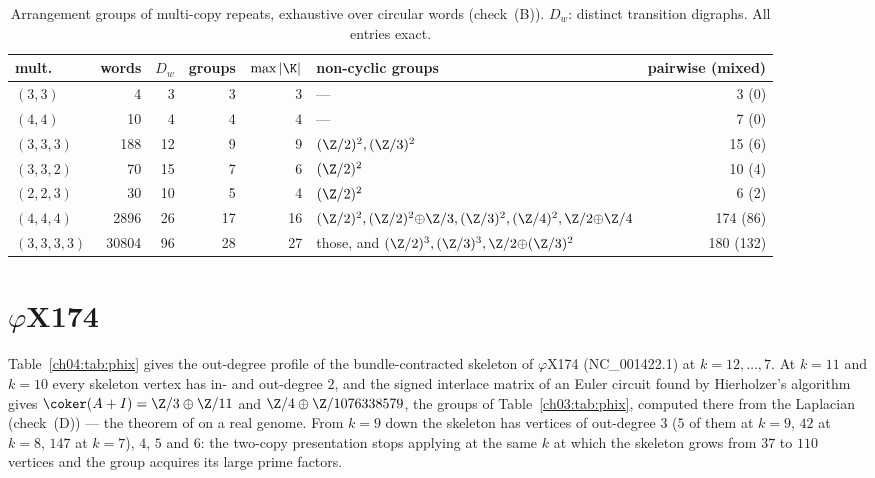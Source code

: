 \begin{table}[ht]
\centering\footnotesize\setlength{\tabcolsep}{4pt}
\begin{tabular}{lrrrrlr}
\toprule
mult. & words & $D_w$ & groups & $\max|\K|$ & non-cyclic groups & pairwise (mixed)\\
\midrule
$(3,3)$       &     4 &  3 &  3 &  3 & --- & 3 (0)\\
$(4,4)$       &    10 &  4 &  4 &  4 & --- & 7 (0)\\
$(3,3,3)$     &   188 & 12 &  9 &  9 & $(\Z/2)^{2},(\Z/3)^{2}$ & 15 (6)\\
$(3,3,2)$     &    70 & 15 &  7 &  6 & $(\Z/2)^{2}$ & 10 (4)\\
$(2,2,3)$     &    30 & 10 &  5 &  4 & $(\Z/2)^{2}$ & 6 (2)\\
$(4,4,4)$     &  2896 & 26 & 17 & 16 & $(\Z/2)^{2},(\Z/2)^{2}{\oplus}\Z/3,(\Z/3)^{2},(\Z/4)^{2},\Z/2{\oplus}\Z/4$ & 174 (86)\\
$(3,3,3,3)$   & 30804 & 96 & 28 & 27 & those, and $(\Z/2)^{3},(\Z/3)^{3},\Z/2{\oplus}(\Z/3)^{2}$ & 180 (132)\\
\bottomrule
\end{tabular}
\caption{Arrangement groups of multi-copy repeats, exhaustive over circular words
(check~(B)). $D_w$: distinct transition digraphs. All entries exact.}
\label{ch04:tab:census}
\end{table}

\section{\texorpdfstring{$\varphi$X174}{phiX174}}\label{ch04:sec:phix}

Table~\ref{ch04:tab:phix} gives the out-degree profile of the bundle-contracted skeleton of
$\varphi$X174 (NC\_001422.1) at $k=12,\dots,7$. At $k=11$ and $k=10$ every skeleton
vertex has in- and out-degree $2$, and the signed interlace matrix of an Euler circuit
found by Hierholzer's algorithm gives $\coker(A+I)=\Z/3\oplus\Z/11$ and
$\Z/4\oplus\Z/1076338579$, the groups of Table~\ref{ch03:tab:phix}, computed there from the Laplacian
(check~(D)) --- the theorem of \cite{MMN} on a real genome. From $k=9$ down the skeleton
has vertices of out-degree $3$ ($5$ of them at $k=9$, $42$ at $k=8$, $147$ at $k=7$),
$4$, $5$ and $6$: the two-copy presentation stops applying at the same $k$ at which the
skeleton grows from $37$ to $110$ vertices and the group acquires its large prime factors.

